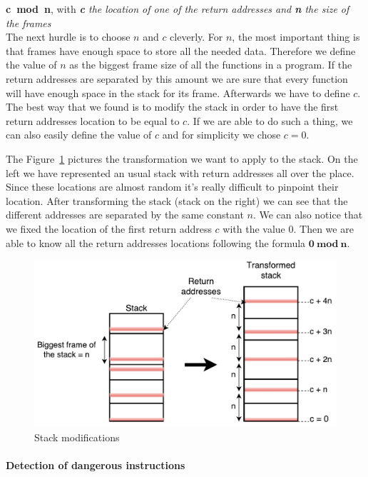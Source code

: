 \documentclass[11pt]{sdm}
\begin{document}
{\large \textbf{c~mod~n}},
with \textit{\textbf{c} the location of one of the return addresses and
\textbf{n} the size of the frames}\\

The next hurdle is to choose $n$ and $c$ cleverly. 
For $n$, the most important thing is that frames have enough space to store all the needed data. Therefore we define the value of $n$ as the biggest frame size of all the functions in a program. If the return addresses are separated by this amount we are sure that every function will have enough space in the stack for its frame. 
Afterwards we have to define $c$. The best way that we found is to modify the stack in order to have the first return addresses location to be equal to $c$. If we are able to do such a thing, we can also easily define the value of $c$ and for simplicity we chose $c=0$.

The Figure~\ref{idea_stack} pictures the transformation we want to apply to the stack. On the left we have represented an usual stack with return addresses all over the place. Since these locations are almost random it's really difficult to pinpoint their location. After transforming the stack (stack on the right) we can see that the different addresses are separated by the same constant $n$. We can also notice that we fixed the location of the first return address $c$ with the value 0.
Then we are able to know all the return addresses locations following the formula $\mathbf{0~mod~n}$.

\begin{figure}[!ht]
\centering
\includegraphics[scale=0.6]{images/idea_stack.pdf}
\caption{Stack modifications}
\label{idea_stack}
\end{figure}

\paragraph{Detection of dangerous instructions}
\label{par:Detection of dangerous instructions}
\end{document}
